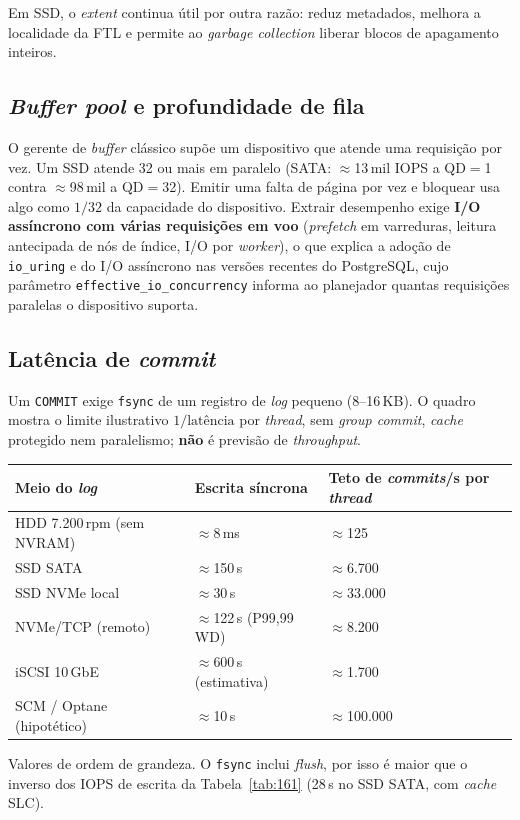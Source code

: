 \documentclass[11pt,a4paper]{article}
\newcommand{\us}{\,\textmu s}
\begin{document}
Em SSD, o \emph{extent} continua útil por outra razão: reduz metadados, melhora a localidade
da FTL e permite ao \emph{garbage collection} liberar blocos de apagamento inteiros.

\subsection{\emph{Buffer pool} e profundidade de fila}

O gerente de \emph{buffer} clássico supõe um dispositivo que atende uma requisição por vez. Um
SSD atende 32 ou mais em paralelo (SATA: $\approx$13\,mil IOPS a QD$=$1 contra $\approx$98\,mil
a QD$=$32). Emitir uma falta de página por vez e bloquear usa algo como $1/32$ da capacidade
do dispositivo. Extrair desempenho exige \textbf{I/O assíncrono com várias requisições em
voo} (\emph{prefetch} em varreduras, leitura antecipada de nós de índice, I/O por
\emph{worker}), o que explica a adoção de \texttt{io\_uring} e do I/O assíncrono nas versões
recentes do PostgreSQL, cujo parâmetro \texttt{effective\_io\_concurrency} informa ao
planejador quantas requisições paralelas o dispositivo suporta.

\subsection{Latência de \emph{commit}}

Um \texttt{COMMIT} exige \texttt{fsync} de um registro de \emph{log} pequeno (8--16\,KB). O
quadro mostra o limite ilustrativo $1/\text{latência}$ por \emph{thread}, sem \emph{group
commit}, \emph{cache} protegido nem paralelismo; \textbf{não} é previsão de \emph{throughput}.

\begin{center}\small
\begin{tabular}{@{}lp{4.2cm}p{4.2cm}@{}}
\toprule
\textbf{Meio do \emph{log}} & \textbf{Escrita síncrona} & \textbf{Teto de \emph{commits}/s por \emph{thread}} \\
\midrule
HDD 7.200\,rpm (sem NVRAM)   & $\approx$8\,ms       & $\approx$125 \\
SSD SATA                     & $\approx$150\us & $\approx$6.700 \\
SSD NVMe local               & $\approx$30\us  & $\approx$33.000 \\
NVMe/TCP (remoto)            & $\approx$122\us{} (P99,99 WD) & $\approx$8.200 \\
iSCSI 10\,GbE                & $\approx$600\us{} (estimativa) & $\approx$1.700 \\
SCM / Optane (hipotético)    & $\approx$10\us  & $\approx$100.000 \\
\bottomrule
\end{tabular}
\end{center}
{\footnotesize Valores de ordem de grandeza. O \texttt{fsync} inclui \emph{flush}, por isso é
maior que o inverso dos IOPS de escrita da Tabela~\ref{tab:161} (28\us{} no SSD SATA, com
\emph{cache} SLC).\par}
\end{document}
